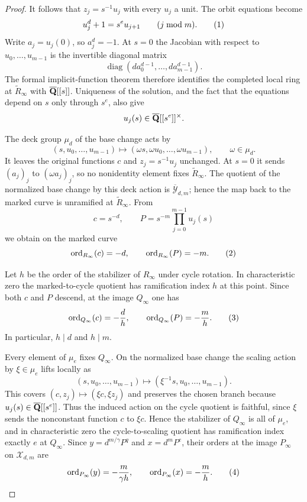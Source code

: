 \begin{proof}
It follows that $z_j=s^{-1}u_j$ with every $u_j$ a unit.  The orbit
equations become
\[
 u_j^d+1=s^e u_{j+1}\qquad(j\bmod m).
 \numberthis\label{eq:infinity-equations}
\]
Write $a_j=u_j(0)$, so $a_j^d=-1$.  At $s=0$ the Jacobian with respect
to $u_0,\ldots,u_{m-1}$ is the invertible diagonal matrix
\[
 \operatorname{diag}(da_0^{d-1},\ldots,da_{m-1}^{d-1}).
\]
The formal implicit-function theorem therefore identifies the completed
local ring at $\widetilde R_\infty$ with $\overline{\mathbf Q}[[s]]$.  Uniqueness
of the solution, and the fact that the equations depend on $s$ only
through $s^e$, also give
\[
 u_j(s)\in\overline{\mathbf Q}[[s^e]]^\times.
\]

The deck group $\mu_d$ of the base change acts by
\[
 (s,u_0,\ldots,u_{m-1})
 \longmapsto(\omega s,\omega u_0,\ldots,\omega u_{m-1}),
 \qquad \omega\in\mu_d.
\]
It leaves the original functions $c$ and $z_j=s^{-1}u_j$ unchanged.
At $s=0$ it sends $(a_j)_j$ to $(\omega a_j)_j$, so no nonidentity
element fixes $\widetilde R_\infty$.  The quotient of the normalized
base change by this deck action is $\overline{\mathcal Y}_{d,m}$;
hence the map back to the marked curve is unramified at
$\widetilde R_\infty$.  From
\[
 c=s^{-d},\qquad
 P=s^{-m}\prod_{j=0}^{m-1}u_j(s)
\]
we obtain on the marked curve
\[
 \ord_{R_\infty}(c)=-d,\qquad
 \ord_{R_\infty}(P)=-m.
 \numberthis\label{eq:marked-infinity-orders}
\]

Let $h$ be the order of the stabilizer of $R_\infty$ under cycle
rotation.  In characteristic zero the marked-to-cycle quotient has
ramification index $h$ at this point.  Since both $c$ and $P$ descend,
at the image $Q_\infty$ one has
\[
 \ord_{Q_\infty}(c)=-\frac dh,\qquad
 \ord_{Q_\infty}(P)=-\frac mh.
 \numberthis\label{eq:cycle-infinity-order}
\]
In particular, $h\mid d$ and $h\mid m$.

Every element of $\mu_e$ fixes $Q_\infty$.  On the normalized base
change the scaling action by $\xi\in\mu_e$ lifts locally as
\[
 (s,u_0,\ldots,u_{m-1})
 \longmapsto(\xi^{-1}s,u_0,\ldots,u_{m-1}).
\]
This covers $(c,z_j)\mapsto(\xi c,\xi z_j)$ and preserves the chosen
branch because $u_j(s)\in\overline{\mathbf Q}[[s^e]]$.  Thus the
induced action on the cycle quotient is faithful, since $\xi$ sends
the nonconstant function $c$ to $\xi c$.  Hence the stabilizer of
$Q_\infty$ is all of $\mu_e$, and in characteristic zero the
cycle-to-scaling quotient has ramification index exactly $e$ at
$Q_\infty$.
Since $y=d^{m/\gamma}P^q$ and $x=d^mP^e$, their orders at the image
$P_\infty$ on $\mathcal X_{d,m}$ are
\[
 \ord_{P_\infty}(y)=-\frac{m}{\gamma h},
 \qquad
 \ord_{P_\infty}(x)=-\frac mh.
 \numberthis\label{eq:infinity-orders}
\]


\end{proof}
